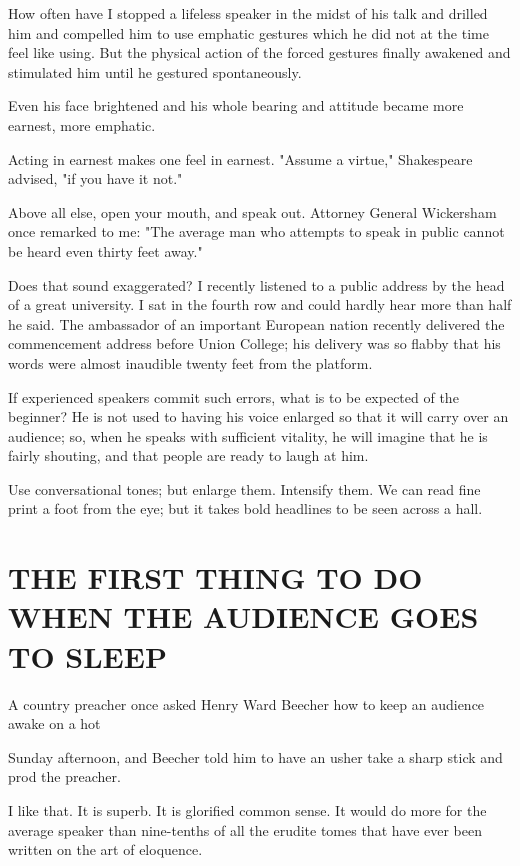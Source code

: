 \documentclass[10pt]{article}
\begin{document}
How often have I stopped a lifeless speaker in the midst of his talk and drilled him and compelled him to use emphatic gestures which he did not at the time feel like using. But the physical action of the forced gestures finally awakened and stimulated him until he gestured spontaneously.

Even his face brightened and his whole bearing and attitude became more earnest, more emphatic.

Acting in earnest makes one feel in earnest. "Assume a virtue," Shakespeare advised, "if you have it not."

Above all else, open your mouth, and speak out. Attorney General Wickersham once remarked to me: "The average man who attempts to speak in public cannot be heard even thirty feet away."

Does that sound exaggerated? I recently listened to a public address by the head of a great university. I sat in the fourth row and could hardly hear more than half he said. The ambassador of an important European nation recently delivered the commencement address before Union College; his delivery was so flabby that his words were almost inaudible twenty feet from the platform.

If experienced speakers commit such errors, what is to be expected of the beginner? He is not used to having his voice enlarged so that it will carry over an audience; so, when he speaks with sufficient vitality, he will imagine that he is fairly shouting, and that people are ready to laugh at him.

Use conversational tones; but enlarge them. Intensify them. We can read fine print a foot from the eye; but it takes bold headlines to be seen across a hall.

\section*{THE FIRST THING TO DO WHEN THE AUDIENCE GOES TO SLEEP}
A country preacher once asked Henry Ward Beecher how to keep an audience awake on a hot

Sunday afternoon, and Beecher told him to have an usher take a sharp stick and prod the preacher.

I like that. It is superb. It is glorified common sense. It would do more for the average speaker than nine-tenths of all the erudite tomes that have ever been written on the art of eloquence.
\end{document}
